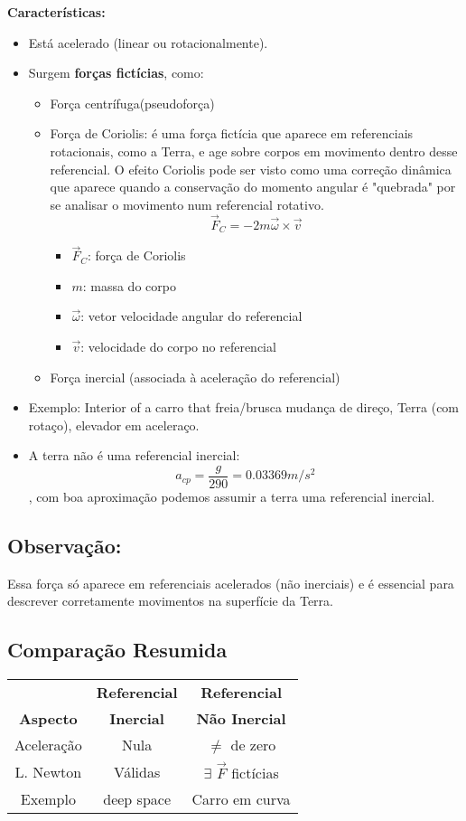 \documentclass[a4paper,12pt]{article}
\begin{document}
\begin{multicols}{2}
\textbf{Características:}
\begin{itemize}
  \item Está acelerado (linear ou rotacionalmente).
  \item Surgem \textbf{forças fictícias}, como:
  \begin{itemize}
    \item Força centrífuga(pseudoforça)
    \item Força de Coriolis: é uma força fictícia que aparece em referenciais rotacionais, como a Terra, e age 
    sobre corpos em movimento dentro desse referencial.
    O efeito Coriolis pode ser visto como uma correção dinâmica que aparece quando a conservação do momento angular 
    é "quebrada" por se analisar o movimento num referencial rotativo.
    \[
        \vec{F}_C = -2m \vec{\omega} \times \vec{v}
    \]
    \begin{itemize}
        \item \( \vec{F}_C \): força de Coriolis
        \item \( m \): massa do corpo
        \item \( \vec{\omega} \): vetor velocidade angular do referencial
        \item \( \vec{v} \): velocidade do corpo no referencial
    \end{itemize}
    \item Força inercial (associada à aceleração do referencial)
  \end{itemize}
  \item Exemplo: Interior of a carro that freia/brusca mudança de direço, Terra (com rotaço), elevador em aceleraço.
  \item A terra não é uma referencial inercial: $$a_{cp} = \frac{g}{290} = 0.03369 m/s^2$$, com boa aproximação podemos assumir a terra uma referencial inercial.
\end{itemize}

\subsection*{Observação:}
Essa força só aparece em referenciais acelerados (não inerciais) e é essencial para descrever corretamente movimentos na superfície da Terra.


\subsection{Comparação Resumida}

\begin{tabular}{|c|c|c|}
\hline
& \textbf{Referencial}& \textbf{Referencial}\\
\textbf{Aspecto} & \textbf{Inercial} & \textbf{Não Inercial} \\
\hline
Aceleração & Nula & $\neq$ de zero \\
L. Newton & Válidas & $\exists$ $\vec{F}$ fictícias \\
Exemplo & deep space & Carro em curva \\
\hline
\end{tabular}




\end{multicols}
\end{document}
